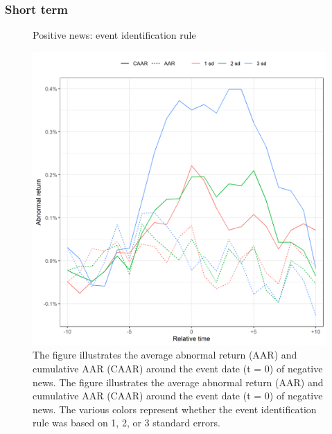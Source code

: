 \subsubsection{Short term}
\begin{figure} [H]
    \centering
    \caption{Positive news: event identification rule}
    \includegraphics[scale=0.6]{Projekt/1.Figures analysis/ST_positive_sensitivity.png}
     \caption*{\footnotesize The figure illustrates the average abnormal return (AAR) and cumulative AAR (CAAR) around the event date (t = 0) of negative news. The figure illustrates the average abnormal return (AAR) and cumulative AAR (CAAR) around the event date (t = 0) of negative news. The various colors represent whether the event identification rule was based on 1, 2, or 3 standard errors. }
    \label{fig:ST_pos_sensi_sd}
\end{figure} 


